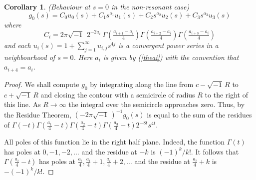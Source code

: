 \documentclass[a4paper,12pt,leqno]{amsart}
\numberwithin{equation}{section}
\theoremstyle{plain}
\newtheorem{corollary}[theorem]{Corollary}
\theoremstyle{definition}
\newcommand{\Ga}{\Gamma}
\newcommand{\ii}{ {\scriptstyle\sqrt{-1}}\, }
\begin{document}
\begin{corollary}\label{taylor} {\em (Behaviour at $s=0$ in the non-resonant case)}  
\[
g_0(s)=C_0 u_0(s) + C_1 s^{a_1}u_1(s)+ C_2 s^{a_2}u_2(s)+ C_3 s^{a_3}u_3(s)
\]
where
\[
C_i=2\pi\ii \ 2^{-2a_i}\  
\Ga( \tfrac {a_{i+1}-a_i}4 ) \Ga( \tfrac {a_{i+2}-a_i}4 ) \Ga( \tfrac {a_{i+3}-a_i}4 )
\]
and each $u_i(s)=1+\sum_{j=1}^\infty u_{i,j}s^{4j}$ is a convergent power series in a neighbourhood of $s=0$.  Here
$a_i$ is given by (\ref{theai}) with the convention that $a_{i+4}=a_i$.
\end{corollary}

\begin{proof}
We shall compute $g_0$ by integrating along the line from $c-\ii R$ to $c+\ii R$ and closing the contour with a semicircle of radius $R$ to the right of this line.  As $R\to\infty$ the integral over the semicircle approaches zero.  Thus, by the Residue Theorem, $(-2\pi\ii)^{-1}g_0(s)$ is equal to the sum of the residues of 
$\Ga( - t)\Ga(\tfrac {a_1}4 - t)\Ga(\tfrac {a_2}4 - t)\Ga(\tfrac {a_3}4 - t)
2^{-8t} s^{4t}$.  

All poles of this function lie in the right half plane.  Indeed,
the function $\Ga(t)$ has poles at $0,-1,-2,\dots$ and the residue at $-k$ is $(-1)^k/k!$.  It follows that $\Ga(\frac{a_i}{4}-t)$ has poles at $\frac{a_i}{4},\frac{a_i}{4}+1,\frac{a_i}{4}+2,\dots$ and the residue at $\frac{a_i}{4}+k$ is  $-(-1)^k/k!$.


\end{proof}
\end{document}
